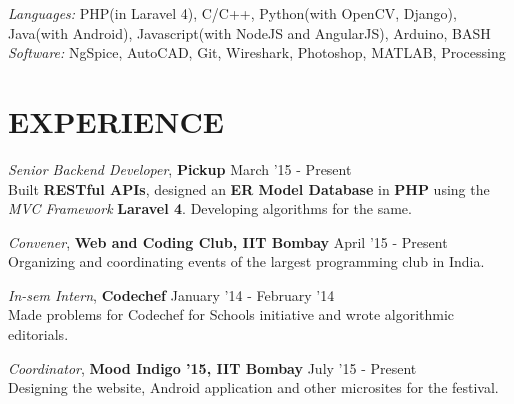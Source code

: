 \documentclass[margin, 10pt]{res} %
\begin{document}
\begin{resume}
{\sl Languages:} PHP(in Laravel 4), C/C++, Python(with OpenCV, Django), Java(with Android), Javascript(with NodeJS and AngularJS), Arduino, BASH\\
{\sl Software:} NgSpice, AutoCAD, Git, Wireshark, Photoshop, MATLAB, Processing
 
 
 
\section{EXPERIENCE}

{\sl Senior Backend Developer}, \textbf{Pickup} \hfill March '15 - Present\\
Built \textbf {RESTful APIs}, designed an \textbf {ER Model Database} in \textbf {PHP} using the \textit {MVC Framework} \textbf{Laravel 4}. Developing algorithms for the same.

 
{\sl Convener}, \textbf{Web and Coding Club, IIT Bombay} \hfill April '15 - Present \\
Organizing and coordinating events of the largest programming club in India.

{\sl In-sem Intern}, \textbf{Codechef} \hfill January '14 - February '14 \\
Made problems for Codechef for Schools initiative and wrote algorithmic editorials.

{\sl Coordinator}, \textbf{Mood Indigo '15, IIT Bombay} \hfill July '15 - Present \\
Designing the website, Android application and other microsites for the festival.


\end{resume}
\end{document}
